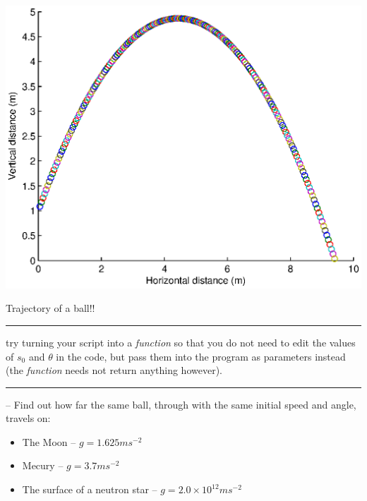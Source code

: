 \documentclass{tufte-book} %
\begin{document}
\begin{marginfigure}[-0.5in]
\includegraphics[width=\linewidth]{ch9-ball_uv.eps}
\caption{Trajectory of a ball!!}
\label{fig:ch9-ball_uv}
\end{marginfigure}

\newpage

\vspace{1mm}
\noindent\rule{4cm}{0.5pt}
\vspace{1mm}

\vspace{-4mm}
 try turning your script into a \textit{function} so that you do not need to edit the values of \(s_{0}\) and \(\theta\) in the code, but pass them into the program as parameters instead (the \textit{function} needs not return anything however).

\vspace{1mm}
\noindent\rule{4cm}{0.5pt}
\vspace{1mm}

\vspace{-4mm}
\newthought{\textbf{\textcolor{red}{OPTIONAL}}} -- Find out how far the same ball, through with the same initial speed and angle, travels on:
\vspace{1mm}
\begin{itemize}[noitemsep]
\item The Moon -- \(g=1.625ms^{-2}\)
\item Mecury -- \(g=3.7ms^{-2}\)
\item The surface of a neutron star -- \(g=2.0 \times 10^{12}ms^{-2}\) 
\end{itemize}
\vspace{-4mm}
\end{document}

